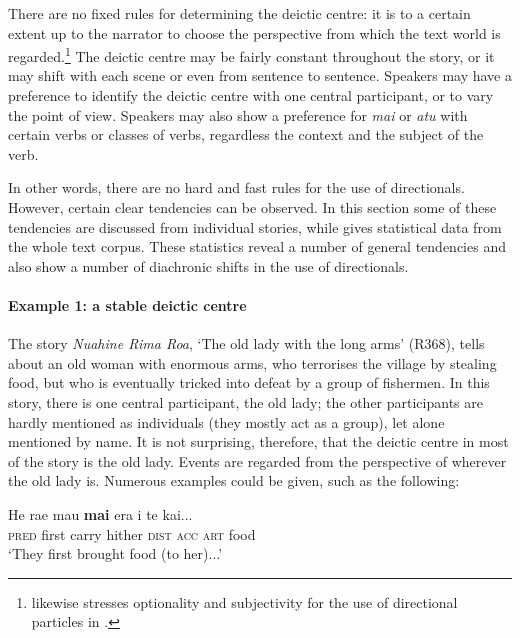 There are no fixed rules for determining the deictic centre: it is to a certain extent up to the narrator to choose the perspective from which the text world is regarded.\footnote{\label{fn:354}\citet[105]{Tchekhoff1990} likewise stresses optionality and subjectivity for the use of directional particles in .} The deictic centre may be fairly constant throughout the story, or it may shift with each scene or even from sentence to sentence. Speakers may have a preference to identify the deictic centre with one central participant, or to vary the point of view. Speakers may also show a preference for \textit{mai} or \textit{atu} with certain verbs or classes of verbs, regardless the context and the subject of the verb. 

In other words, there are no hard and fast rules for the use of directionals. However, certain clear tendencies can be observed. In this section some of these tendencies are discussed from individual stories, while  gives statistical data from the whole text corpus. These statistics reveal a number of general tendencies and also show a number of diachronic shifts in the use of directionals.

\paragraph[Example 1: a stable deictic centre]{Example 1: a stable deictic centre}\label{sec:7.5.1.2.1}

The story \textit{Nuahine Rima Roa}, ‘The old lady with the long arms’ (R368), tells about an old woman with enormous arms, who terrorises the village by stealing food, but who is eventually tricked into defeat by a group of fishermen. In this story, there is one central participant, the old lady; the other participants are hardly mentioned as individuals (they mostly act as a group), let alone mentioned by name. It is not surprising, therefore, that the deictic centre in most of the story is the old lady. Events are regarded from the perspective of wherever the old lady is. Numerous examples could be given, such as the following:

\ea\label{ex:7.134}
\gll He ra{\ꞌ}e ma{\ꞌ}u \textbf{mai} era i te kai... \\
\textsc{pred} first carry hither \textsc{dist} \textsc{acc} \textsc{art} food \\

\glt 
‘They first brought food (to her)...’ \textstyleExampleref{[R368.006]} 
\z

